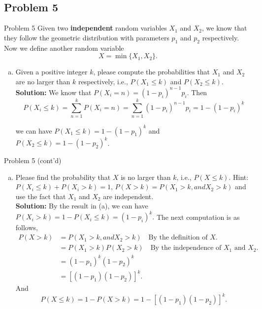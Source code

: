 \documentclass{beamer}
\begin{document}
\subsection{Problem 5}
\begin{frame}{Problem 5}
Given two \textbf{independent} random variables $X_1$ and $X_2$, we know that they follow the geometric distribution with parameters $p_1$ and $p_2$ respectively. Now we define another random variable $$X = \min\{X_1,X_2\}.$$
\vspace{-0.5cm}
        \begin{enumerate}[(a)]
            \item Given a positive integer $k$, please compute the probabilities that $X_1$ and $X_2$ are no larger than $k$ respectively, i.e.,
    $P(X_1 \leq k)$ and $P(X_2\leq k)$.\\
    {\bf Solution: }We know that $P(X_i = n) = (1-p_i)^{n-1}p_i$. Then
    $$P(X_i\leq k) = \sum_{n = 1}^kP(X_i = n) = \sum_{n = 1}^k(1-p_i)^{n-1}p_i = 1-(1-p_i)^k$$

we can have $P(X_1 \leq k) = 1-(1-p_1)^k$ and $P(X_2 \leq k) = 1-(1-p_2)^k$.
        \end{enumerate}
\end{frame}
\begin{frame}{Problem 5 (cont'd)}
    \begin{enumerate}[(b)]
        \item Please find the probability that $X$ is no larger than $k$, i.e., $P(X\leq k)$. Hint: $P(X_i\leq k)+ P(X_i> k) = 1$, $P(X> k) = P(X_1> k, {and } X_2> k)$ and use the fact that $X_1$ and $X_2$ are independent.\\
            {\bf Solution:}
            By the result in (a), we can have $P(X_i>k) = 1-P(X_i\leq k) = (1-p_i)^k.$ The next computation is as follows,
            \begin{align*}
            P(X> k) &= P(X_1> k, {and } X_2> k) \quad \text{By the definition of $X$.}\\
            &=P(X_1>k)P(X_2>k) \quad \text{By the independence of $X_1$ and $X_2$.}\\
            & =(1-p_1)^k(1-p_2)^k\\
            & = \left[(1-p_1)(1-p_2)\right]^k.
            \end{align*}
            And $$P(X\leq k) = 1-P(X>k) = 1-\left[(1-p_1)(1-p_2)\right]^k.$$
    \end{enumerate}
\end{frame}
\end{document}
